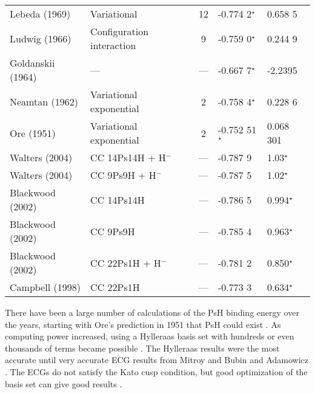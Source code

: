 \documentclass[Dissertation.tex]{subfiles}
\begin{document}
\begin{center}
\begin{longtable}{l l c l l}
Lebeda (1969) \cite{Lebeda1969} & Variational & 12 & -0.774 2$^\star$ & 0.658 5 \\*
Ludwig (1966) \cite{Ludwig1966} & Configuration interaction & 9 & -0.759 0$^\star$ & 0.244 9 \\*
Goldanskii (1964) \cite{Clary1976} & --- & --- & -0.667 7$^\star$ & -2.2395 \\*
Neamtan (1962) \cite{Neamtan1962} & Variational exponential & 2 & -0.758 4$^\star$ & 0.228 6 \\*
Ore (1951) \cite{Ore1951} & Variational exponential & 2 & -0.752 51$^\star$ & 0.068 301 \\*
Walters (2004) \cite{Walters2004} & CC 14Ps14H + H$^-$ & --- & -0.787 9 & 1.03$^\star$\\*
Walters (2004) \cite{Walters2004} & CC 9Ps9H + H$^-$ & --- & -0.787 5 & 1.02$^\star$\\*
Blackwood (2002) \cite{Blackwood2002} & CC 14Ps14H & --- & -0.786 5  & 0.994$^\star$ \\*
Blackwood (2002) \cite{Blackwood2002} & CC 9Ps9H & --- & -0.785 4 & 0.963$^\star$ \\*
Blackwood (2002) \cite{Blackwood2002b} & CC 22Ps1H + H$^-$ & --- & -0.781 2 & 0.850$^\star$ \\*
Campbell (1998) \cite{Campbell1998} & CC 22Ps1H & --- & -0.773 3 & 0.634$^\star$ \\*
\bottomrule
\end{longtable}
\end{center}



There have been a large number of calculations of the PsH binding energy over the years, starting with Ore's prediction in 1951 that PsH could exist \cite{Ore1951}. As computing power increased, using a Hylleraas basis set with hundreds or even thousands of terms became possible \cite{Ho1978,Ho1986,Yan1999,VanReeth2003}. The Hylleraas results were the most accurate until very accurate ECG results from Mitroy \cite{Mitroy2006} and Bubin and Adamowicz \cite{Bubin2004,Bubin2006}. The ECGs do not satisfy the Kato cusp condition, but good optimization of the basis set can give good results \cite{Mitroy2013}.
\end{document}
